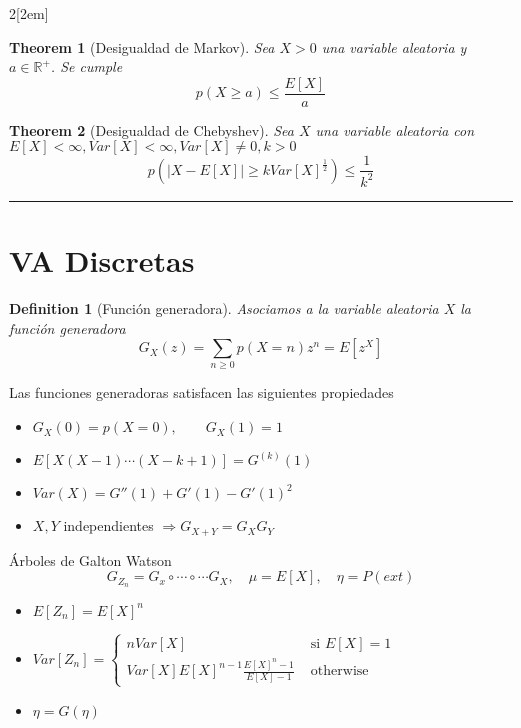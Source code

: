 \documentclass{myclass}
\newtheorem*{theorem}{Theorem}
\newtheorem*{definition}{Definition}
\begin{document}
\begin{multicols}{2}[\columnsep2em]
\begin{theorem}[Desigualdad de Markov]
Sea $X>0$ una variable aleatoria y  $a\in \mathbb{R}^+$. Se cumple
\[
p(X\ge a)\le \frac{E[X]}{a}
\] 
\end{theorem}

\begin{theorem}[Desigualdad de Chebyshev] Sea $X$ una variable aleatoria con  $E[X]<\infty, Var[X]<\infty, Var[X]\neq 0, k>0$
  \[
  p(|X-E[X]|\ge kVar[X]^{\frac{1}{2}})\le \frac{1}{k^2}
  \] 
\end{theorem}

\hrule

\section{VA Discretas}

\begin{definition}[Función generadora] Asociamos a la variable aleatoria $X$ la función generadora
   \[
  G_X(z) = \sum_{n\ge 0} p(X=n)z^n = E[z^X]
  \] 
\end{definition}

Las funciones generadoras satisfacen las siguientes propiedades
\begin{itemize}[topsep=-6pt, itemsep=0pt]
  \item $G_X(0) = p(X=0), \qquad G_X(1) = 1$
  \item $E[X(X-1)\cdots (X-k+1)] =G^{(k)}(1)$ 
  \item $Var(X) = G''(1)+G'(1)-G'(1)^2$ 
  \item $X, Y$ independientes  $\Rightarrow G_{X+Y} = G_XG_Y$
\end{itemize}

Árboles de Galton Watson
\[
G_{Z_n}=G_x \circ \cdots \circ \cdots G_X, \quad \mu = E[X], \quad \eta = P(ext)
\] 
 \begin{itemize}[topsep=-6pt, itemsep=0pt]
  \item $E[Z_n] = E[X]^n$
  \item  $Var[Z_n] = \begin{cases}
	  nVar[X]  & \text{ si } E[X] = 1\\
	  Var[X]E[X]^{n-1} \frac{E[X]^n-1}{E[X]-1} & \text{ otherwise}
  \end{cases}$
  \item $\eta = G(\eta)$ 
\end{itemize}


\end{multicols}

\newpage
\end{document}
